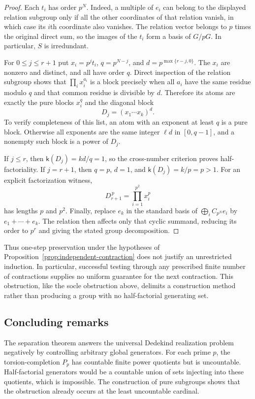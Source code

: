 \documentclass[11pt,reqno]{amsart}
\numberwithin{equation}{section}
\theoremstyle{definition}
\theoremstyle{remark}
\begin{document}
\begin{proof}
Each $t_i$ has order $p^N$. Indeed, a multiple of $e_i$ can
belong to the displayed relation subgroup only if all the other
coordinates of that relation vanish, in which case its $i$th
coordinate also vanishes. The relation vector belongs to $p$
times the original direct sum, so the images of the $t_i$ form a
basis of $G/pG$. In particular, $S$ is irredundant.

For $0\le j\le r+1$ put $x_i=p^jt_i$,
$q=p^{N-j}$, and $d=p^{\max\{r-j,0\}}$. The $x_i$ are
nonzero and distinct, and all have order $q$. Direct inspection
of the relation subgroup shows that $\prod_i x_i^{a_i}$ is a
block precisely when all $a_i$ have the same residue modulo $q$
and that common residue is divisible by $d$. Therefore its atoms
are exactly the pure blocks $x_i^q$ and the diagonal block
\[
 D_j=(x_1\cdots x_k)^d.
\]
To verify completeness of this list, an atom with an exponent at
least $q$ is a pure block. Otherwise all exponents are the same
integer $\ell d$ in $[0,q-1]$, and a nonempty such block is a
power of $D_j$.

If $j\le r$, then $\mathsf k(D_j)=kd/q=1$, so the
cross-number criterion proves half-factoriality. If $j=r+1$,
then $q=p$, $d=1$, and $\mathsf k(D_j)=k/p=p>1$.
For an explicit factorization witness,
\[
 D_{r+1}^{\,p}=\prod_{i=1}^{p^2}x_i^p
\]
has lengths $p$ and $p^2$. Finally, replace $e_k$ in the standard
basis of $\bigoplus_iC_{p^N}e_i$ by $e_1+\cdots+e_k$.
The relation then affects only that cyclic summand, reducing its
order to $p^r$ and giving the stated group decomposition.
\end{proof}

Thus one-step preservation under the hypotheses of
Proposition~\ref{prop:independent-contraction} does not justify
an unrestricted induction. In particular, successful testing
through any prescribed finite number of contractions supplies no
uniform guarantee for the next contraction. This obstruction, like
the socle obstruction above, delimits a construction method rather
than producing a group with no half-factorial generating set.

\subsection{Concluding remarks}

The separation theorem answers the universal Dedekind realization
problem negatively by controlling arbitrary global generators.
For each prime $p$, the torsion-completion $P_p$ has countable
finite power quotients but is uncountable. Half-factorial generators
would be a countable union of sets injecting into these quotients,
which is impossible. The construction of pure subgroups shows that
the obstruction already occurs at the least uncountable cardinal.
\end{document}
